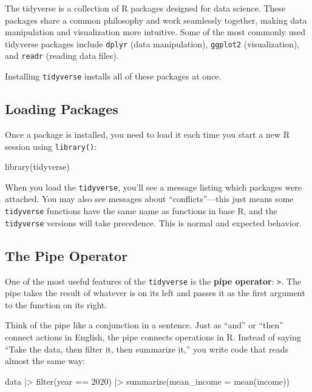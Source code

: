\documentclass[
  letterpaper,
  DIV=11,
  numbers=noendperiod]{scrreprt}
\newenvironment{Shaded}{\begin{snugshade}}{\end{snugshade}}
\newcommand{\AttributeTok}[1]{\textcolor[rgb]{0.40,0.45,0.13}{#1}}
\newcommand{\DecValTok}[1]{\textcolor[rgb]{0.68,0.00,0.00}{#1}}
\newcommand{\FunctionTok}[1]{\textcolor[rgb]{0.28,0.35,0.67}{#1}}
\newcommand{\NormalTok}[1]{\textcolor[rgb]{0.00,0.23,0.31}{#1}}
\newcommand{\SpecialCharTok}[1]{\textcolor[rgb]{0.37,0.37,0.37}{#1}}
\begin{document}
The tidyverse is a collection of R packages designed for data science.
These packages share a common philosophy and work seamlessly together,
making data manipulation and visualization more intuitive. Some of the
most commonly used tidyverse packages include \texttt{dplyr} (data
manipulation), \texttt{ggplot2} (visualization), and \texttt{readr}
(reading data files).

Installing \texttt{tidyverse} installs all of these packages at once.

\subsection{Loading Packages}\label{loading-packages}

Once a package is installed, you need to load it each time you start a
new R session using \texttt{library()}:

\begin{Shaded}
\begin{Highlighting}[]
\FunctionTok{library}\NormalTok{(tidyverse)}
\end{Highlighting}
\end{Shaded}

When you load the \texttt{tidyverse}, you'll see a message listing which
packages were attached. You may also see messages about
``conflicts''---this just means some \texttt{tidyverse} functions have
the same name as functions in base R, and the \texttt{tidyverse}
versions will take precedence. This is normal and expected behavior.

\subsection{The Pipe Operator}\label{the-pipe-operator}

One of the most useful features of the \texttt{tidyverse} is the
\textbf{pipe operator}: \texttt{\textbar{}\textgreater{}}. The pipe
takes the result of whatever is on its left and passes it as the first
argument to the function on its right.

Think of the pipe like a conjunction in a sentence. Just as ``and'' or
``then'' connect actions in English, the pipe connects operations in R.
Instead of saying ``Take the data, then filter it, then summarize it,''
you write code that reads almost the same way:

\begin{Shaded}
\begin{Highlighting}[]
\NormalTok{data }\SpecialCharTok{|\textgreater{}}
  \FunctionTok{filter}\NormalTok{(year }\SpecialCharTok{==} \DecValTok{2020}\NormalTok{) }\SpecialCharTok{|\textgreater{}}
  \FunctionTok{summarize}\NormalTok{(}\AttributeTok{mean\_income =} \FunctionTok{mean}\NormalTok{(income))}
\end{Highlighting}
\end{Shaded}
\end{document}
